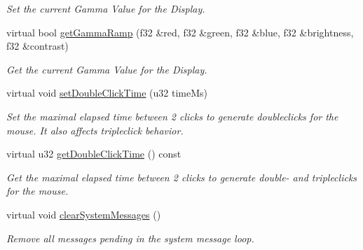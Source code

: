 \begin{DoxyCompactItemize}
\begin{DoxyCompactList}\small\item\em Set the current Gamma Value for the Display. \end{DoxyCompactList}\item 
\hypertarget{classirr_1_1_c_irr_device_stub_a45ec311d0ffa1f867c52565abd6a0d7b}{virtual bool \hyperlink{classirr_1_1_c_irr_device_stub_a45ec311d0ffa1f867c52565abd6a0d7b}{get\-Gamma\-Ramp} (f32 \&red, f32 \&green, f32 \&blue, f32 \&brightness, f32 \&contrast)}\label{classirr_1_1_c_irr_device_stub_a45ec311d0ffa1f867c52565abd6a0d7b}

\begin{DoxyCompactList}\small\item\em Get the current Gamma Value for the Display. \end{DoxyCompactList}\item 
virtual void \hyperlink{classirr_1_1_c_irr_device_stub_a7b0051fadfb8cd0534c8b4ec2c2ef36a}{set\-Double\-Click\-Time} (u32 time\-Ms)
\begin{DoxyCompactList}\small\item\em Set the maximal elapsed time between 2 clicks to generate doubleclicks for the mouse. It also affects tripleclick behavior. \end{DoxyCompactList}\item 
\hypertarget{classirr_1_1_c_irr_device_stub_a1fe3f7bccf70bb19dc70912fd1dd88b5}{virtual u32 \hyperlink{classirr_1_1_c_irr_device_stub_a1fe3f7bccf70bb19dc70912fd1dd88b5}{get\-Double\-Click\-Time} () const }\label{classirr_1_1_c_irr_device_stub_a1fe3f7bccf70bb19dc70912fd1dd88b5}

\begin{DoxyCompactList}\small\item\em Get the maximal elapsed time between 2 clicks to generate double-\/ and tripleclicks for the mouse. \end{DoxyCompactList}\item 
\hypertarget{classirr_1_1_c_irr_device_stub_aa9b88c208661f4f656f846ea56d426cc}{virtual void \hyperlink{classirr_1_1_c_irr_device_stub_aa9b88c208661f4f656f846ea56d426cc}{clear\-System\-Messages} ()}\label{classirr_1_1_c_irr_device_stub_aa9b88c208661f4f656f846ea56d426cc}

\begin{DoxyCompactList}\small\item\em Remove all messages pending in the system message loop. \end{DoxyCompactList}\end{DoxyCompactItemize}
